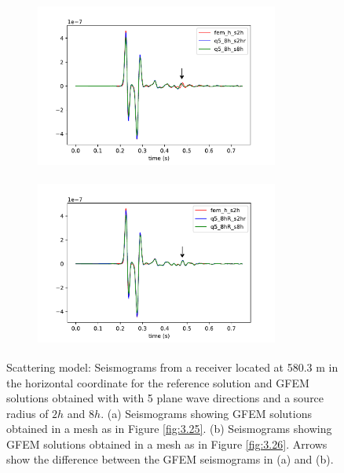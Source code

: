  \begin{figure}[h!]
 		\centering
		\begin{subfigure}{8cm}
				\includegraphics[width=8cm, height=5.5cm]{Thesis_Edith/figures/scattering/scat_waves/gfem_scat_tr75_v2.pdf} 
			     \caption{}
		\end{subfigure}
        \hspace{0.25cm}	
		\begin{subfigure}{8cm}
				\includegraphics[width=8cm, height=5.5cm]{Thesis_Edith/figures/scattering/scat_waves/gfemr_scat_tr75_v2.pdf}
			   \caption{}
		\end{subfigure}
 
	\caption{Scattering model: Seismograms from a receiver located at 580.3 m in the horizontal coordinate for the reference solution and  GFEM solutions obtained  with  with 5 plane wave directions and a source radius of $2h$ and $8h$. (a) Seismograms showing GFEM solutions obtained in a mesh as in Figure \ref{fig:3.25}. (b) Seismograms showing GFEM solutions obtained in a mesh as in Figure \ref{fig:3.26}. Arrows show the difference between the GFEM seismograms in (a) and (b).}
	\label{fig:3.30}
\end{figure}

